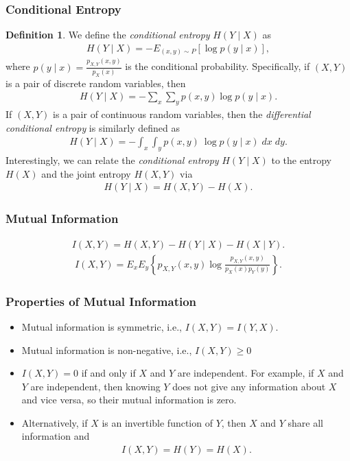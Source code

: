 \documentclass[a4paper,12pt]{article}
\theoremstyle{definition}
\newtheorem*{definition}{Definition}
\begin{document}
\subsubsection*{Conditional Entropy}
\begin{definition}
    We define the \emph{conditional entropy} $H(Y \mid X)$ as
    \begin{align*}
        H(Y \mid X) = - E_{(x, y) \sim P} [\log p(y \mid x)],
    \end{align*}
    where $p(y \mid x) = \frac{p_{X, Y}(x, y)}{p_X(x)}$ is the conditional probability. 
    Specifically, if $(X, Y)$ is a pair of discrete random variables, then
    \begin{align*}
        H(Y \mid X) = - \sum_{x} \sum_{y} p(x, y) \log p(y \mid x).
    \end{align*}
    If $(X,Y)$ is a pair of continuous random variables, then the \emph{differential conditional entropy} 
    is similarly defined as
    \begin{align*}
        H(Y \mid X) = - \int_x \int_y p(x, y) \ \log p(y \mid x) \;dx \;dy.
    \end{align*}
    Interestingly, we can relate the \emph{conditional entropy} $H(Y \mid X)$ to the
    entropy $H(X)$ and the joint entropy $H(X, Y)$ via
    \begin{align*}
        H(Y \mid X) = H(X, Y) - H(X).
    \end{align*}

\end{definition}

\subsubsection*{Mutual Information}

\begin{align*}
    I(X, Y) = H(X, Y) - H(Y \mid X) - H(X \mid Y).
\end{align*}
\begin{align*}
    I(X, Y) = E_{x} E_{y} \left\{ p_{X, Y}(x, y) \log\frac{p_{X, Y}(x, y)}{p_X(x) p_Y(y)} \right\}. 
\end{align*}

\subsubsection*{Properties of Mutual Information}
\begin{itemize}
    \item Mutual information is symmetric, i.e., $I(X, Y) = I(Y, X)$.
    \item Mutual information is non-negative, i.e., $I(X, Y) \geq 0$ 
    \item  $I(X, Y) = 0$ if and only if $X$ and $Y$ are independent. For example, 
    if $X$ and $Y$ are independent, then knowing $Y$ does not give any information 
    about $X$ and vice versa, so their mutual information is zero.
    \item Alternatively, if $X$ is an invertible function of $Y$, then $X$ and $Y$ 
    share all information and
    \begin{align*}
        I(X, Y) = H(Y) = H(X).
    \end{align*}
\end{itemize}
\end{document}
